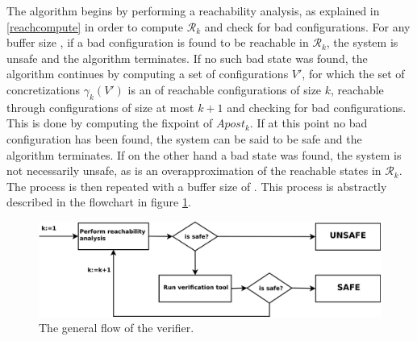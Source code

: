 The algorithm begins by performing a reachability analysis, as explained in \ref{reachcompute} in order to compute $\mathcal{R}_k$ and check for bad configurations. For any buffer size , if a bad configuration is found to be reachable in $\mathcal{R}_k$, the system is unsafe and the algorithm terminates. If no such bad state was found, the algorithm continues by computing a set of configurations $V'$, for which the set of concretizations $\gamma_k(V')$ is an  of reachable configurations of size $k$, reachable through configurations of size at most $k+1$ and checking for bad configurations. This is done by computing the fixpoint of $Apost_k$. If at this point no bad configuration has been found, the system can be said to be safe and the algorithm terminates. If on the other hand a bad state was found, the system is not necessarily unsafe, as  is an overapproximation of the reachable states in $\mathcal{R}_k$. The process is then repeated with a buffer size of . This process is abstractly described in the flowchart in figure \ref{flow}.

\begin{figure}
\includegraphics[width=400pt] {bilder/flowchart.png}
\caption{The general flow of the verifier.}
\label{flow}
\end{figure}
